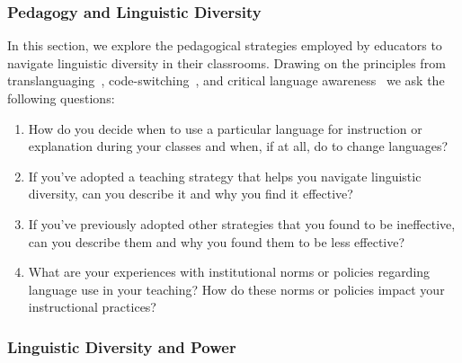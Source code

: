 {\subsubsection{Pedagogy and Linguistic Diversity}\label{subsubsec:pedagogy-and-translanguaging}

In this section, we explore the pedagogical strategies employed by educators 
to navigate linguistic diversity in their classrooms. Drawing on the principles
from translanguaging~\cite{}, code-switching~\cite{}, and critical language awareness~\cite{} we ask the following
questions:
\begin{enumerate}[label={PT.\arabic*}, align=left, leftmargin=4em]
  \item How do you decide when to use a particular language for
    instruction or explanation during your classes and when, if at all, do
    to change languages?
  \item If you've adopted a teaching strategy that helps you navigate
    linguistic diversity, can you describe it and why you find it effective?
  \item If you've previously adopted other strategies that you found to be
    ineffective, can you describe them and why you found them to be less
    effective?
  \item What are your experiences with institutional norms or policies regarding
    language use in your teaching? How do these norms or policies impact your
    instructional practices?
\end{enumerate}

\subsubsection{Linguistic Diversity and Power}\label{subsubsec:linguistic-diversity-and-power}

}

